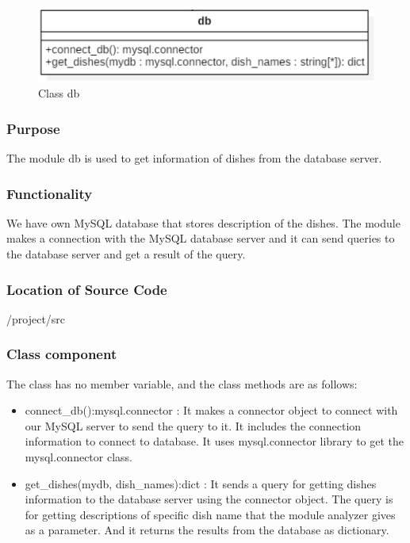 \begin{figure}[htbp]
\centerline{\includegraphics[width=\linewidth]{./pictures/class_db}}
\caption{Class db}
\label{fig:class_db}
\end{figure}
\FloatBarrier

\subsubsection {Purpose}

The module db is used to get information of dishes from the database server.   
\subsubsection {Functionality}

We have own MySQL database that stores description of the dishes. The module makes a connection with the MySQL database server and it can send queries to the database server and get a result of the query. 


\subsubsection {Location of Source Code}

/project/src

\subsubsection {Class component}

The class has no member variable, and the class methods are as follows:

\begin{itemize}
\item connect\_db():mysql.connector :  It makes a connector object to connect with our MySQL server to send the query to it. It includes the connection information to connect to database. It uses mysql.connector library to get the mysql.connector class. 

\item get\_dishes(mydb, dish\_names):dict : It sends a query for getting dishes information to the database server using the connector object. The query is for getting descriptions of specific dish name that the module analyzer gives as a parameter. And it returns the results from the database as dictionary.  

\end{itemize} 

\FloatBarrier

